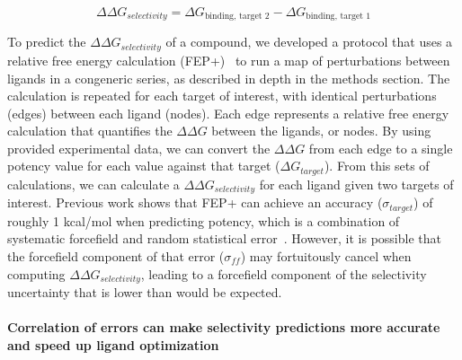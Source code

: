 \documentclass[9pt,lineno]{elife-modified} %
\begin{document}
\begin{equation}\label{selectivity}
\Delta \Delta G_{selectivity} = \Delta G_{\text{binding, target 2}} - \Delta G_{\text{binding, target 1}}
\end{equation}

To predict the $\Delta \Delta G_{selectivity}$ of a compound, we developed a protocol that uses a relative free energy calculation (FEP+)~\citep{Wang:J.Am.Chem.Soc.:2015} to run a map of perturbations between ligands in a congeneric series, as described in depth in the methods section. The calculation is repeated for each target of interest, with identical perturbations (edges) between each ligand (nodes). Each edge represents a relative free energy calculation that quantifies the $\Delta \Delta G$ between the ligands, or nodes. By using provided experimental data, we can convert the $\Delta \Delta G$ from each edge to a single potency value for each value against that target ($\Delta G_{target}$). From this sets of calculations, we can calculate a $\Delta \Delta G_{selectivity}$ for each ligand given two targets of interest. Previous work shows that FEP+ can achieve an accuracy ($\sigma_{target}$) of roughly 1 kcal/mol when predicting potency, which is a combination of systematic forcefield and random statistical error~\citep{Wang:J.Am.Chem.Soc.:2015}. However, it is possible that the forcefield component of that error ($\sigma_{ff}$) may fortuitously cancel when computing $\Delta \Delta G_{selectivity}$, leading to a forcefield component of the selectivity uncertainty that is lower than would be expected. 

\paragraph{Correlation of errors can make selectivity predictions more accurate and speed up ligand optimization}
\end{document}
